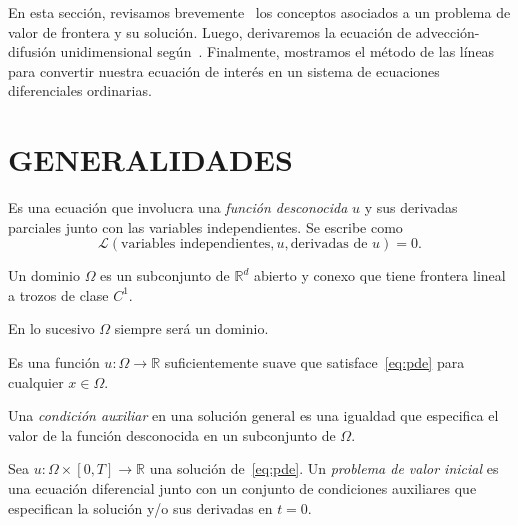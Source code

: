 En esta sección, revisamos
brevemente~\citep{choksi_partial_2022,salgado_classical_2022} los
conceptos asociados a un problema de valor de frontera y su solución.
Luego, derivaremos la ecuación de advección-difusión unidimensional
según~\citep{leveque_numerical_1992}.
Finalmente, mostramos el método de las líneas para convertir nuestra
ecuación de interés en un sistema de ecuaciones diferenciales
ordinarias.

\section{GENERALIDADES}

\begin{definition}
    Es una ecuación que involucra una \emph{función desconocida} $u$
    y sus derivadas parciales junto con las variables independientes.
    Se escribe como
    \begin{equation}
        \mathcal{L}
        \left(
        \text{variables independientes},
        u,
        \text{derivadas de $u$}
        \right)
        =0.
        \label{eq:pde}
    \end{equation}
\end{definition}

\begin{definition}[Dominio]
    Un dominio $\Omega$ es un subconjunto de $\mathbb{R}^{d}$ abierto
    y conexo que tiene frontera lineal a trozos de clase $C^{1}$.
\end{definition}

En lo sucesivo $\Omega$ siempre será un dominio.

\begin{definition}
    Es una función $u\colon\Omega\to\mathbb{R}$ suficientemente suave
    que satisface~\eqref{eq:pde} para cualquier $x\in\Omega$.
\end{definition}

\begin{definition}
    Una \emph{condición auxiliar} en una solución general es una
    igualdad que especifica el valor de la función desconocida en un
    subconjunto de $\Omega$.
\end{definition}

\begin{definition}
    Sea
    \begin{math}
        u\colon
        \Omega\times\left[0,T\right]
        \to\mathbb{R}
    \end{math}
    una solución de~\eqref{eq:pde}.
    Un \emph{problema de valor inicial} es una ecuación diferencial
    junto con un conjunto de condiciones auxiliares que especifican
    la solución y/o sus derivadas en $t=0$.
\end{definition}

